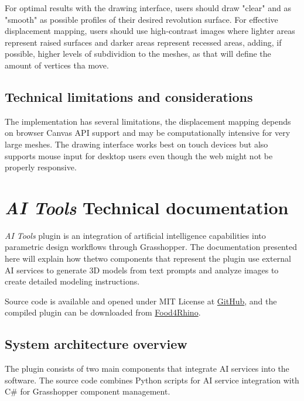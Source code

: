 For optimal results with the drawing interface, users should draw "clear" and as "smooth" as possible profiles of their desired revolution surface. For effective displacement mapping, users should use high-contrast images where lighter areas represent raised surfaces and darker areas represent recessed areas, adding, if possible, higher levels of subdividion to the meshes, as that will define the amount of vertices tha move. 

\subsection{Technical limitations and considerations}

The implementation has several limitations, the displacement mapping depends on browser Canvas API support and may be computationally intensive for very large meshes. The drawing interface works best on touch devices but also supports mouse input for desktop users even though the web might not be properly responsive.

\clearpage
\section{\textit{AI Tools} Technical documentation}

\textit{AI Tools} plugin is an integration of artificial intelligence capabilities into parametric design workflows through Grasshopper. The documentation presented here will explain how thetwo components that represent the plugin use external AI services to generate 3D models from text prompts and analyze images to create detailed modeling instructions.

\vspace{0.5cm}

Source code is available and opened under MIT License at \href{https://github.com/jmuozan/AI_3D_Models_Grasshopper}{GitHub}, and the compiled plugin can be downloaded from \href{https://www.food4rhino.com/en/app/ai-tools}{Food4Rhino}.

\subsection{System architecture overview}

The plugin consists of two main components that integrate AI services into the software. The source code combines Python scripts for AI service integration with C\# for Grasshopper component management.

